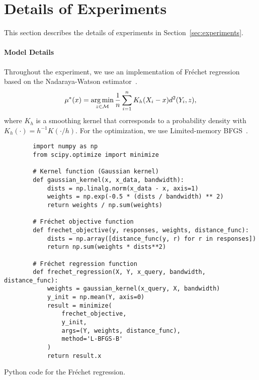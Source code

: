 \section{Details of Experiments}
\label{sec:details_of_experiments}
This section describes the details of experiments in Section~\ref{sec:experiments}.

\paragraph{Model Details}
Throughout the experiment, we use an implementation of Fréchet regression based on the Nadaraya-Watson estimator~\citep{davis2010population,hein2009robust,steinke2008non}.
\begin{align*}
    \mu^*(x) = \operatorname*{arg\,min}_{z \in \mathcal{M}}\frac{1}{n}\sum^n_{i=1}K_h(X_i - x)d^2(Y_i, z),
\end{align*}
where $K_h$ is a smoothing kernel that corresponds to a probability density with $K_h(\cdot) = h^{-1}K(\cdot / h)$.
For the optimization, we use Limited-memory BFGS~\citep{liu1989limited}.

\begin{listing}[H]
    \begin{verbatim}
        import numpy as np
        from scipy.optimize import minimize

        # Kernel function (Gaussian kernel)
        def gaussian_kernel(x, x_data, bandwidth):
            dists = np.linalg.norm(x_data - x, axis=1)
            weights = np.exp(-0.5 * (dists / bandwidth) ** 2)
            return weights / np.sum(weights)
        
        # Fréchet objective function
        def frechet_objective(y, responses, weights, distance_func):
            dists = np.array([distance_func(y, r) for r in responses])
            return np.sum(weights * dists**2)
        
        # Fréchet regression function
        def frechet_regression(X, Y, x_query, bandwidth, distance_func):
            weights = gaussian_kernel(x_query, X, bandwidth)
            y_init = np.mean(Y, axis=0)
            result = minimize(
                frechet_objective,
                y_init,
                args=(Y, weights, distance_func),
                method='L-BFGS-B'
            )
            return result.x
    \end{verbatim}
    \caption{Python code for the Fréchet regression.}
    \label{lst:python_code_frechet_regression}
\end{listing}

